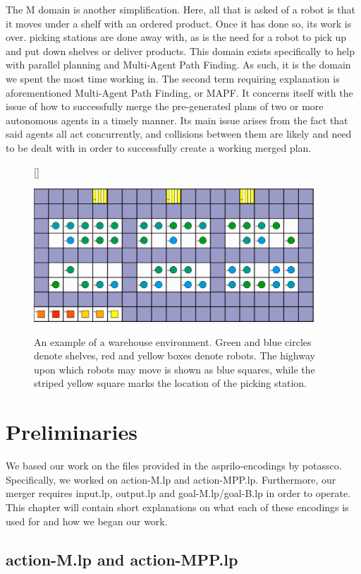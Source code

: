 \documentclass{llncs}
\begin{document}
The M domain is another simplification. Here, all that is asked of a robot is that it moves under a shelf with an ordered product. Once it has done so, its work is over. picking stations are done away with, as is the need for a robot to pick up and put down shelves or deliver products. This domain exists specifically to help with parallel planning and Multi-Agent Path Finding. As such, it is the domain we spent the most time working in.\newpage
The second term requiring explanation is aforementioned Multi-Agent Path Finding, or MAPF. It concerns itself with the issue of how to successfully merge the pre-generated plans of two or more autonomous agents in a timely manner. Its main issue arises from the fact that said agents all act concurrently, and collisions between them are likely and need to be dealt with in order to successfully create a working merged plan.
\begin{figure}[h!]
[\FBwidth]
{\caption{An example of a warehouse environment. Green and blue circles denote shelves, red and yellow boxes denote robots. The highway upon which robots may move is shown as blue squares, while the striped yellow square marks the location of the picking station.}\label{fig:test}}
{\includegraphics[width=\textwidth, height= 5cm, keepaspectratio]{asp}}
\end{figure}\newpage



\section{Preliminaries}
We based our work on the files provided in the asprilo-encodings by potassco. Specifically, we worked on action-M.lp and action-MPP.lp. Furthermore, our merger requires input.lp, output.lp and goal-M.lp/goal-B.lp in order to operate. This chapter will contain short explanations on what each of these encodings is used for and how we began our work.
\subsection{action-M.lp and action-MPP.lp}
\end{document}
